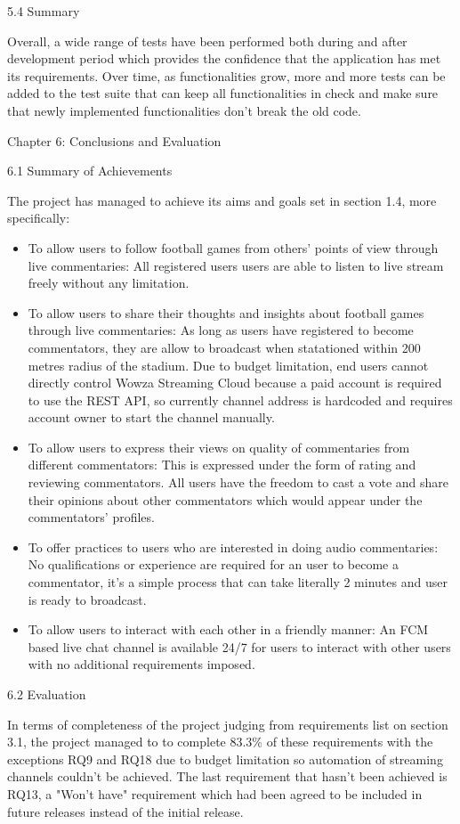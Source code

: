 \documentclass{article}
\begin{document}
\begin{flushleft}
{\Large 5.4 Summary}\par
Overall, a wide range of tests have been performed both during and after development period which provides the confidence that the application has met its requirements. Over time, as functionalities grow, more and more tests can be added to the test suite that can keep all functionalities in check and make sure that newly implemented functionalities don't break the old code.\par
{\huge Chapter 6: Conclusions and Evaluation}\par
{\Large 6.1 Summary of Achievements}\par
The project has managed to achieve its aims and goals set in section 1.4, more specifically:
\begin{itemize}
	\item To allow users to follow football games from others' points of view through live commentaries: All registered users users are able to listen to live stream freely without any limitation.
	\item To allow users to share their thoughts and insights about football games through live commentaries: As long as users have registered to become commentators, they are allow to broadcast when statationed within 200 metres radius of the stadium. Due to budget limitation, end users cannot directly control Wowza Streaming Cloud because a paid account is required to use the REST API, so currently channel address is hardcoded and requires account owner to start the channel manually.
	\item To allow users to express their views on quality of commentaries from different commentators: This is expressed under the form of rating and reviewing commentators. All users have the freedom to cast a vote and share their opinions about other commentators which would appear under the commentators' profiles.
	\item To offer practices to users who are interested in doing audio commentaries: No qualifications or experience are required for an user to become a commentator, it's a simple process that can take literally 2 minutes and user is ready to broadcast.
	\item To allow users to interact with each other in a friendly manner: An FCM based live chat channel is available 24/7 for users to interact with other users with no additional requirements imposed.
\end{itemize}
{\Large 6.2 Evaluation}\par
In terms of completeness of the project judging from requirements list on section 3.1, the project managed to to complete 83.3\% of these requirements with the exceptions RQ9 and RQ18 due to budget limitation so automation of streaming channels couldn't be achieved. The last requirement that hasn't been achieved is RQ13, a "Won't have" requirement which had been agreed to be included in future releases instead of the initial release.\par

\end{flushleft}
\end{document}
